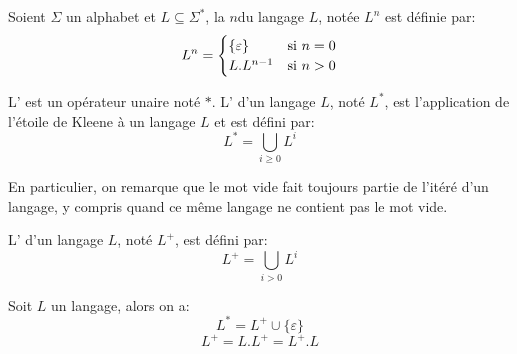 \begin{definition}
	Soient \( \Sigma \) un alphabet et \( L \subseteq \Sigma^* \), la  \( n \)\ieme du langage \( L \), notée \( L^n \) est définie par:
	\[
		L^n =
		\begin{cases}
			\{ \varepsilon \} & \text{si \( n = 0\)} \\
			L . L^{n-1}       & \text{si \( n > 0\)}
		\end{cases}
	\]
\end{definition}


\begin{definition}
	L' est un opérateur unaire noté \( * \). L' d'un langage \( L \), noté \( L^* \), est l'application de l'étoile de Kleene à un langage \( L \) et est défini par:
	\begin{equation}
		L^* = \bigcup_{i \geq 0} L^i
	\end{equation}
\end{definition}

En particulier, on remarque que le mot vide fait toujours partie de l'itéré d'un langage, y compris quand ce même langage ne contient pas le mot vide.

\begin{definition}
	L' d'un langage \( L \), noté \( L^+ \), est défini par:
	\begin{equation}
		L^+ = \bigcup_{i > 0} L^i
	\end{equation}
\end{definition}

\begin{proposition}
	Soit \( L \) un langage, alors on a:
	\begin{equation}
		L^* = L^+ \cup \{ \varepsilon \}
	\end{equation}
	\begin{equation}
		L^+ = L.L^+ = L^+.L
	\end{equation}
\end{proposition}
